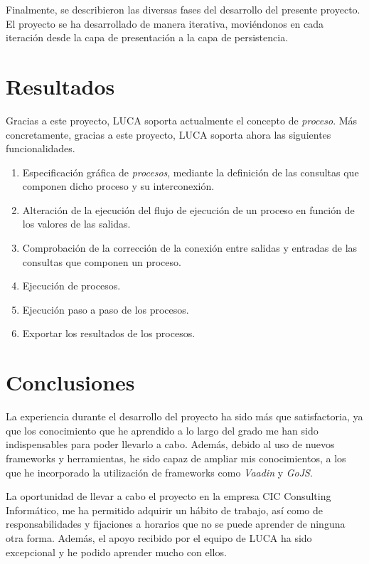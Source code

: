 Finalmente, se describieron las diversas fases del desarrollo del presente proyecto. El proyecto se ha desarrollado de manera iterativa, moviéndonos en cada iteración desde la capa de presentación a la capa de persistencia. 

\section{Resultados}

Gracias a este proyecto, LUCA soporta actualmente el concepto de \emph{proceso}. Más concretamente, gracias a este proyecto, LUCA soporta ahora las siguientes funcionalidades. 

\begin{enumerate}
	\item Especificación gráfica de \emph{procesos}, mediante la definición de las consultas que componen dicho proceso y su interconexión.
	\item Alteración de la ejecución del flujo de ejecución de un proceso en función de los valores de las salidas.
    \item Comprobación de la corrección de la conexión entre salidas y entradas de las consultas que componen un proceso.
    \item Ejecución de procesos.
	\item Ejecución paso a paso de los procesos.
	\item Exportar los resultados de los procesos.
\end{enumerate}

\section{Conclusiones}


La experiencia durante el desarrollo del proyecto ha sido más que satisfactoria, ya que los conocimiento que he aprendido a lo largo del grado me han sido indispensables para poder llevarlo a cabo. Además, debido al uso de nuevos frameworks y herramientas, he sido capaz de ampliar mis conocimientos, a los que he incorporado la utilización de frameworks como \emph{Vaadin} y \emph{GoJS}.

La oportunidad de llevar a cabo el proyecto en la empresa CIC Consulting Informático, me ha permitido adquirir un hábito de trabajo, así como de responsabilidades y fijaciones a horarios que no se puede aprender de ninguna otra forma. Además, el apoyo recibido por el equipo de LUCA ha sido excepcional y he podido aprender mucho con ellos.


